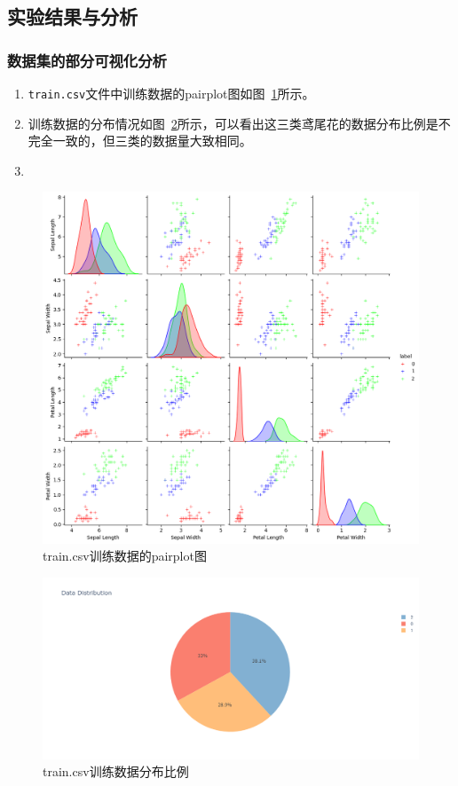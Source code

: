 \documentclass[12pt]{article}
\begin{document}
\subsection{实验结果与分析}
\subsubsection{数据集的部分可视化分析}
\begin{enumerate}
  \item \texttt{train.csv}文件中训练数据的pairplot图如图~\ref{fig:pairplot}所示。
  \item 训练数据的分布情况如图~\ref{fig:pie}所示，可以看出这三类鸢尾花的数据分布比例是不完全一致的，但三类的数据量大致相同。
  \item
\end{enumerate}

\begin{figure}[htbp]
  \centering
  \includegraphics[scale=0.45]{figures/knn/pairplot.png}
  \caption{train.csv训练数据的pairplot图}
  \label{fig:pairplot}
\end{figure}

\begin{figure}[htbp]
  \centering
  \includegraphics[scale=0.4]{figures/knn/distribution.png}
  \caption{train.csv训练数据分布比例}
  \label{fig:pie}
\end{figure}
\end{document}
